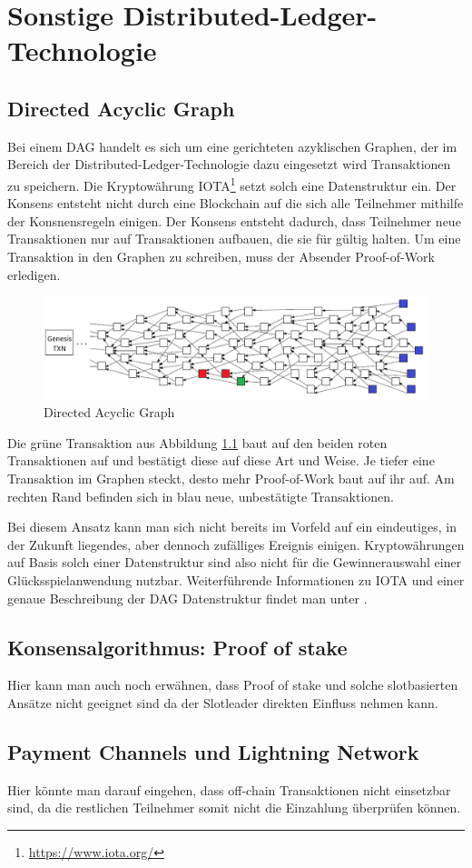 \chapter{Sonstige Distributed-Ledger-Technologie}
\section{Directed Acyclic Graph}
Bei einem DAG handelt es sich um eine gerichteten azyklischen Graphen, der im Bereich der  Distributed-Ledger-Technologie dazu eingesetzt wird Transaktionen zu speichern.
Die Kryptowährung IOTA\footnote{\url{https://www.iota.org/}} setzt solch eine Datenstruktur ein. Der Konsens entsteht nicht durch eine Blockchain auf die sich alle Teilnehmer mithilfe der Konsnensregeln einigen. Der Konsens entsteht dadurch, dass Teilnehmer neue Transaktionen nur auf Transaktionen aufbauen, die sie für gültig halten. Um eine Transaktion in den Graphen zu schreiben, muss der Absender Proof-of-Work erledigen. 

\begin{figure}[H]
\centering
\includegraphics[width=1\linewidth]{Figures/tangle}
\decoRule
\caption{Directed Acyclic Graph}
\label{fig:tangle}
\end{figure}

Die grüne Transaktion aus Abbildung \ref{fig:tangle} baut auf den beiden roten Transaktionen auf und bestätigt diese auf diese Art und Weise. Je tiefer eine Transaktion im Graphen steckt, desto mehr Proof-of-Work baut auf ihr auf. Am rechten Rand befinden sich in blau neue, unbestätigte Transaktionen.

Bei diesem Ansatz kann man sich nicht bereits im Vorfeld auf ein eindeutiges, in der Zukunft liegendes, aber dennoch zufälliges Ereignis einigen. Kryptowährungen auf Basis solch einer Datenstruktur sind also nicht für die Gewinnerauswahl einer Glücksspielanwendung nutzbar.
Weiterführende Informationen zu IOTA und einer genaue Beschreibung der DAG Datenstruktur findet man unter \citep{tangle_whitepaper}.
\section{Konsensalgorithmus: Proof of stake }\label{pos}
Hier kann man auch noch erwähnen, dass Proof of stake und solche slotbasierten Ansätze nicht geeignet sind da der Slotleader direkten Einfluss nehmen kann.
\section{Payment Channels und Lightning Network}
Hier könnte man darauf eingehen, dass off-chain Transaktionen nicht einsetzbar sind, da die restlichen Teilnehmer somit nicht die Einzahlung überprüfen können.